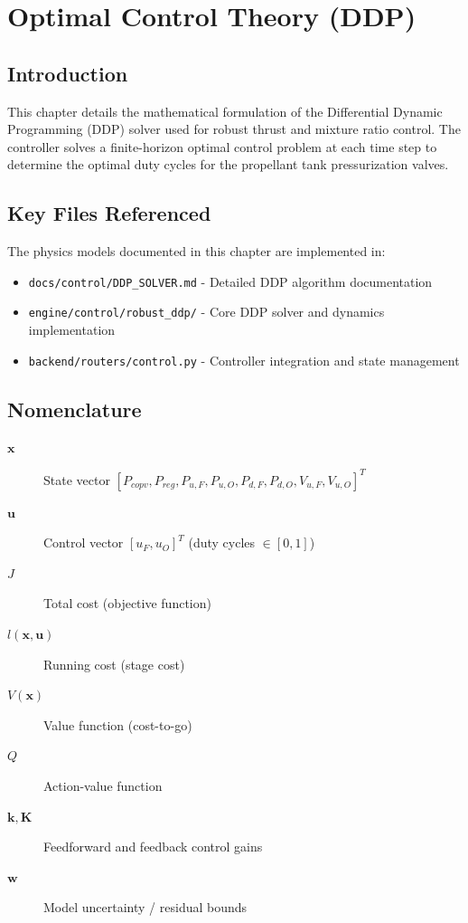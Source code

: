 \section{Optimal Control Theory (DDP)}

\subsection{Introduction}
This chapter details the mathematical formulation of the Differential Dynamic Programming (DDP) solver used for robust thrust and mixture ratio control. The controller solves a finite-horizon optimal control problem at each time step to determine the optimal duty cycles for the propellant tank pressurization valves.

\subsection{Key Files Referenced}
The physics models documented in this chapter are implemented in:
\begin{itemize}
    \item \texttt{docs/control/DDP_SOLVER.md} - Detailed DDP algorithm documentation
    \item \texttt{engine/control/robust_ddp/} - Core DDP solver and dynamics implementation
    \item \texttt{backend/routers/control.py} - Controller integration and state management
\end{itemize}

\subsection{Nomenclature}
\begin{description}
    \item[$\mathbf{x}$] State vector $[P_{copv}, P_{reg}, P_{u,F}, P_{u,O}, P_{d,F}, P_{d,O}, V_{u,F}, V_{u,O}]^T$
    \item[$\mathbf{u}$] Control vector $[u_F, u_O]^T$ (duty cycles $\in [0, 1]$)
    \item[$J$] Total cost (objective function)
    \item[$l(\mathbf{x}, \mathbf{u})$] Running cost (stage cost)
    \item[$V(\mathbf{x})$] Value function (cost-to-go)
    \item[$Q$] Action-value function
    \item[$\mathbf{k}, \mathbf{K}$] Feedforward and feedback control gains
    \item[$\mathbf{w}$] Model uncertainty / residual bounds
\end{description}

